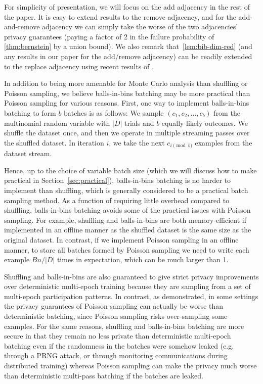 For simplicity of presentation, we will focus on the add adjacency in the rest of the paper. It is easy to extend results to the remove adjacency, and for the add-and-remove adjacency we can simply take the worse of the two adjacencies' privacy guarantees (paying a factor of 2 in the failure probability of \cref{thm:bernstein} by a union bound). We also remark that~\cref{lem:bib-dim-red} (and any results in our paper for the add/remove adjacency) can be readily extended to the replace adjacency using recent results of \citet{schuchardt2024unified}.

 In addition to being more amenable for Monte Carlo analysis than shuffling or Poisson sampling, we believe balls-in-bins batching may be more practical than Poisson sampling for various reasons. First, one way to implement balls-in-bins batching to form $b$ batches is as follows: We sample $(c_1, c_2, \ldots, c_b)$ from the multinomial random variable with $|D|$ trials and $b$ equally likely outcomes. We shuffle the dataset once, and then we operate in multiple streaming passes over the shuffled dataset. In iteration $i$, we take the next $c_{i \pmod b}$ examples from the dataset stream.

Hence, up to the choice of variable batch size (which we will discuss how to make practical in Section~\ref{sec:practical}), balls-in-bins batching is no harder to implement than shuffling, which is generally considered to be a practical batch sampling method. As a function of requiring little overhead compared to shuffling, balls-in-bins batching avoids some of the practical issues with Poisson sampling. For example, shuffling and balls-in-bins are both memory-efficient if implemented in an offline manner as the shuffled dataset is the same size as the original dataset. In contrast, if we implement Poisson sampling in an offline manner, to store all batches formed by Poisson sampling we need to write each example $B n /|D|$ times in expectation, which can be much larger than 1. 

Shuffling and balls-in-bins are also guaranteed to give strict privacy improvements over deterministic multi-epoch training because they are sampling from a set of multi-epoch participation patterns. In contrast, as \citet{chua2024private} demonstrated, in some settings the privacy guarantees of Poisson sampling can actually be worse than deterministic batching, since Poisson sampling risks over-sampling some examples. For the same reasons, shuffling and balls-in-bins  batching are more secure in that they remain no less private than deterministic multi-epoch batching even if the randomness in the batches were somehow leaked (e.g. through a PRNG attack, or through monitoring communications during distributed training) whereas Poisson sampling can make the privacy much worse than deterministic multi-pass batching if the batches are leaked. 

